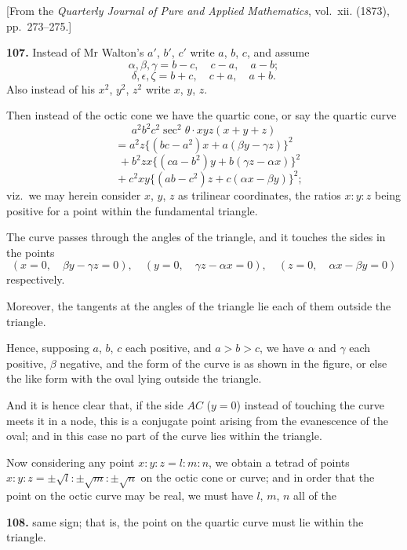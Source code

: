 \documentclass[11pt,a4paper]{book}
\begin{document}
\begin{flushright}
\small[From the \textit{Quarterly Journal of Pure and Applied Mathematics}, vol.~xii. (1873), pp.~273--275.]
\end{flushright}

\noindent\textbf{107.} Instead of Mr Walton's $a'$, $b'$, $c'$ write $a$, $b$, $c$, and assume
\[
\alpha, \beta, \gamma = b - c, \quad c - a, \quad a - b;
\]
\[
\delta, \epsilon, \zeta = b + c, \quad c + a, \quad a + b.
\]
Also instead of his $x^2$, $y^2$, $z^2$ write $x$, $y$, $z$.

Then instead of the octic cone we have the quartic cone, or say the quartic curve
\[
a^2b^2c^2\sec^2\theta\cdot xyz(x + y + z)
\]
\[
= a^2z\{(bc - a^2)x + a(\beta y - \gamma z)\}^2
\]
\[
\quad {}+ b^2zx\{(ca - b^2)y + b(\gamma z - \alpha x)\}^2
\]
\[
\quad {}+ c^2xy\{(ab - c^2)z + c(\alpha x - \beta y)\}^2;
\]
viz.\ we may herein consider $x$, $y$, $z$ as trilinear coordinates, the ratios $x : y : z$ being positive for a point within the fundamental triangle.

The curve passes through the angles of the triangle, and it touches the sides in the points
\[
(x = 0, \quad \beta y - \gamma z = 0), \quad (y = 0, \quad \gamma z - \alpha x = 0), \quad (z = 0, \quad \alpha x - \beta y = 0)
\]
respectively.

Moreover, the tangents at the angles of the triangle lie each of them outside the triangle.

Hence, supposing $a$, $b$, $c$ each positive, and $a > b > c$, we have $\alpha$ and $\gamma$ each positive, $\beta$ negative, and the form of the curve is as shown in the figure, or else the like form with the oval lying outside the triangle.

And it is hence clear that, if the side $AC$ ($y = 0$) instead of touching the curve meets it in a node, this is a conjugate point arising from the evanescence of the oval; and in this case no part of the curve lies within the triangle.

Now considering any point $x : y : z = l : m : n$, we obtain a tetrad of points $x : y : z = \pm\sqrt{l} : \pm\sqrt{m} : \pm\sqrt{n}$ on the octic cone or curve; and in order that the point on the octic curve may be real, we must have $l$, $m$, $n$ all of the

\noindent\textbf{108.} same sign; that is, the point on the quartic curve must lie within the triangle.
\end{document}
